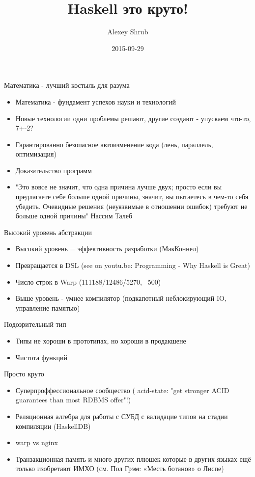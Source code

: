 \documentclass[aspectratio=169]{beamer}
\title{Haskell это круто!}
\author{Alexey Shrub}
\date{2015-09-29}
\begin{document}
\maketitle

\begin{frame}{Математика - лучший костыль для разума}
\begin{itemize}
\item Математика - фундамент успехов науки и технологий
\pause
\item Новые технологии одни проблемы решают, другие создают - упускаем что-то, 7+-2?
\pause
\item Гарантированно безопасное автоизменение кода (лень, параллель, оптимизация)
\pause
\item Доказательство программ
\pause
\item "Это вовсе не значит, что одна причина лучше двух; просто если вы предлагаете себе больше одной причины, значит, вы пытаетесь в чем-то себя убедить. Очевидные решения (неуязвимые в отношении ошибок) требуют не больше одной причины" Нассим Талеб
\end{itemize}

\end{frame}

\begin{frame}{Высокий уровень абстракции}
\begin{itemize}
\item Высокий уровень = эффективность разработки (МакКоннел)
\pause
\item Превращается в DSL (see on youtu.be: Programming - Why Haskell is Great)
\pause
\item Число строк в Warp (111188/12486/5270, ~500)
\pause
\item Выше уровень - умнее компилятор (подкапотный неблокирующий IO, управление памятью)
\end{itemize}
\end{frame}

\begin{frame}{Подозрительный тип}
\begin{itemize}
\item Типы не хороши в прототипах, но хороши в продакшене
\pause
\item Чистота функций
\end{itemize}
\end{frame}

\begin{frame}{Просто круто}
\begin{itemize}
\item Суперпроффессиональное сообщество ( acid-state: "get stronger ACID guarantees than most RDBMS offer"!)
\pause
\item Реляционная алгебра для работы с СУБД с валидацие типов на стадии компиляции (HaskellDB)
\pause
\item warp vs nginx
\pause
\item Транзакционная память и много других плюшек которые в других языках ещё только изобретают ИМХО (см. Пол Грэм: «Месть ботанов» о Лиспе)
\end{itemize}
\end{frame}
\end{document}
